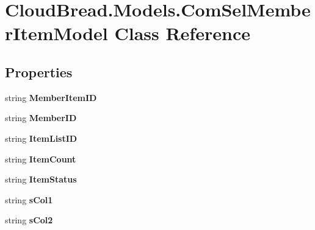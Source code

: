 \hypertarget{a00064}{}\section{Cloud\+Bread.\+Models.\+Com\+Sel\+Member\+Item\+Model Class Reference}
\label{a00064}
\subsection*{Properties}
\begin{DoxyCompactItemize}
\item 
string {\bfseries Member\+Item\+ID}\hypertarget{a00064_a78851c6a420ba0dea98cbd4467ae16e2}{}\label{a00064_a78851c6a420ba0dea98cbd4467ae16e2}

\item 
string {\bfseries Member\+ID}\hypertarget{a00064_a28fc7f426216265484dd107c5cca722f}{}\label{a00064_a28fc7f426216265484dd107c5cca722f}

\item 
string {\bfseries Item\+List\+ID}\hypertarget{a00064_a126016d3ccce8025559e663c946700ef}{}\label{a00064_a126016d3ccce8025559e663c946700ef}

\item 
string {\bfseries Item\+Count}\hypertarget{a00064_a7191280e43c82f107a36436b3b5be4b7}{}\label{a00064_a7191280e43c82f107a36436b3b5be4b7}

\item 
string {\bfseries Item\+Status}\hypertarget{a00064_a0b02e23b4799a9cd1704e2a4ddbbad8e}{}\label{a00064_a0b02e23b4799a9cd1704e2a4ddbbad8e}

\item 
string {\bfseries s\+Col1}\hypertarget{a00064_a8a966177cd60d39afb2eb4b3a62de4e4}{}\label{a00064_a8a966177cd60d39afb2eb4b3a62de4e4}

\item 
string {\bfseries s\+Col2}\hypertarget{a00064_a6f241cf66d8a8476dc895309fd83b934}{}\label{a00064_a6f241cf66d8a8476dc895309fd83b934}


\end{DoxyCompactItemize}
